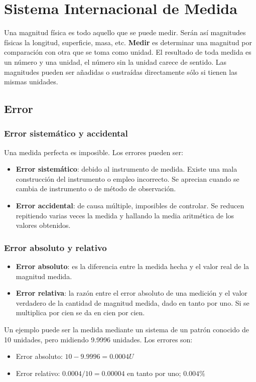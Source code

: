 \chapter{Sistema Internacional de Medida}
Una magnitud física es todo aquello que se puede medir. Serán así magnitudes físicas la longitud, superficie, masa, etc. \textbf{Medir} es determinar una magnitud por comparación con otra que se toma como unidad. El resultado de toda medida es un número y una unidad, el número sin la unidad carece de sentido. Las magnitudes pueden ser añadidas o sustraídas directamente sólo si tienen las mismas unidades.
\section{Error}
\subsection{Error sistemático y accidental}
Una medida perfecta es imposible. Los errores pueden ser:
\begin{itemize}[itemsep=0pt,parsep=0pt,topsep=0pt,partopsep=0pt]
    \item \textbf{Error sistemático}: debido al instrumento de medida. Existe una mala construcción del instrumento o empleo incorrecto. Se aprecian cuando se cambia de instrumento o de método de observación.
    \item\textbf{Error accidental}: de causa múltiple, imposibles de controlar. Se reducen repitiendo varias veces la medida y hallando la media aritmética de los valores obtenidos.
\end{itemize}
\subsection{Error absoluto y relativo}
\begin{itemize}[itemsep=0pt,parsep=0pt,topsep=0pt,partopsep=0pt]
    \item \textbf{Error absoluto}: es la diferencia entre la medida hecha y el valor real de la magnitud medida.
    \item\textbf{Error relativa}: la razón entre el error absoluto de una medición y el valor verdadero de la cantidad de magnitud medida, dado en tanto por uno. Si se multiplica por cien se da en cien por cien.
\end{itemize}

Un ejemplo puede ser la medida mediante un sistema de un patrón conocido de 10 unidades, pero midiendo 9.9996 unidades. Los errores son:
\begin{itemize}[itemsep=0pt,parsep=0pt,topsep=0pt,partopsep=0pt]
    \item Error absoluto: $10 - 9.9996 = 0.0004 U$
    \item Error relativo: $0.0004 / 10 = 0.00004$ en tanto por uno; $0.004\%$
\end{itemize}
